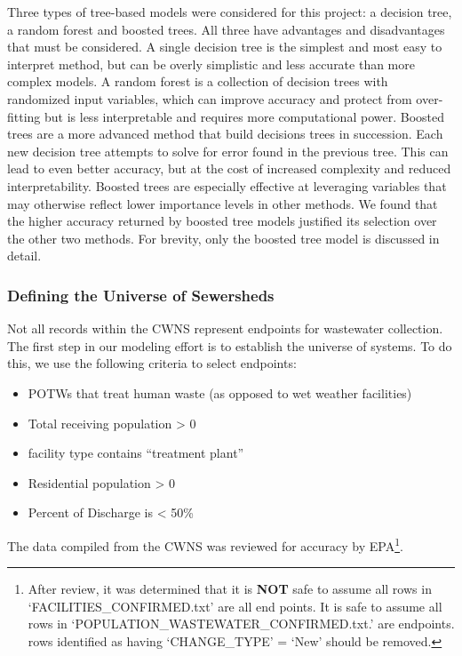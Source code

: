\documentclass[
  letterpaper,
  DIV=11,
  numbers=noendperiod]{scrartcl}
\providecommand{\tightlist}{%
  \setlength{\itemsep}{0pt}\setlength{\parskip}{0pt}}\usepackage{longtable,booktabs,array}
\begin{document}
Three types of tree-based models were considered for this project: a
decision tree, a random forest and boosted trees. All three have
advantages and disadvantages that must be considered. A single decision
tree is the simplest and most easy to interpret method, but can be
overly simplistic and less accurate than more complex models. A random
forest is a collection of decision trees with randomized input
variables, which can improve accuracy and protect from over-fitting but
is less interpretable and requires more computational power. Boosted
trees are a more advanced method that build decisions trees in
succession. Each new decision tree attempts to solve for error found in
the previous tree. This can lead to even better accuracy, but at the
cost of increased complexity and reduced interpretability. Boosted trees
are especially effective at leveraging variables that may otherwise
reflect lower importance levels in other methods. We found that the
higher accuracy returned by boosted tree models justified its selection
over the other two methods. For brevity, only the boosted tree model is
discussed in detail.

\subsubsection{Defining the Universe of
Sewersheds}\label{defining-the-universe-of-sewersheds}

Not all records within the CWNS represent endpoints for wastewater
collection. The first step in our modeling effort is to establish the
universe of systems. To do this, we use the following criteria to select
endpoints:

\begin{itemize}
\tightlist
\item
  POTWs that treat human waste (as opposed to wet weather facilities)\\
\item
  Total receiving population \textgreater{} 0\\
\item
  facility type contains ``treatment plant''
\item
  Residential population \textgreater{} 0
\item
  Percent of Discharge is \textless{} 50\%
\end{itemize}

The data compiled from the CWNS was reviewed for accuracy by
EPA\footnote{After review, it was determined that it is \textbf{NOT}
  safe to assume all rows in `FACILITIES\_CONFIRMED.txt' are all end
  points. It is safe to assume all rows in
  `POPULATION\_WASTEWATER\_CONFIRMED.txt.' are endpoints. rows
  identified as having `CHANGE\_TYPE' = `New' should be removed.}.
\end{document}
